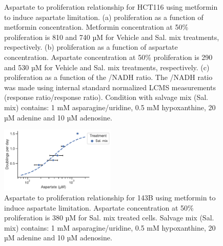 \begin{figure}[ht]
\begin{subfigure}[b]{0.49\textwidth}
         \caption{}
         \label{fig:app_ch2:HCT116_Met_NAD_vs_prlfr}
     \end{subfigure}
        \caption[HCT116 metformin titration aspartate to proliferation.]{
        Aspartate to proliferation relationship for HCT116 using metformin to induce aspartate limitation.
        (a) proliferation as a function of metformin concentration.
        Metformin concentration at 50\% proliferation is 810 and 740 µM for Vehicle and Sal. mix treatments, respectively.
        (b) proliferation as a function of aspartate concentration.
        Aspartate concentration at 50\% proliferation is 290 and 530 µM for Vehicle and Sal. mix treatments, respectively.
        (c) proliferation as a function of the \NAD{}/NADH ratio.
        The \NAD{}/NADH ratio was made using internal standard normalized LCMS measurements (response ratio/response ratio).
        Condition with salvage mix (Sal. mix) contains: 1 mM asparagine/uridine, 0.5 mM hypoxanthine, 20 µM adenine and 10 µM adenosine.
        }
        \label{fig:app_ch2:HCT116_asp_prlfr_met}
\end{figure}

\begin{figure}[ht]
    \centering
    \includegraphics[width=0.49\textwidth]{figures/chap2/app/143B_Met_Asp_vs_prlfr.pdf}
    \caption[143B metformin titration aspartate to proliferation.]{
    Aspartate to proliferation relationship for 143B using metformin to induce aspartate limitation.
    Aspartate concentration at 50\% proliferation is 380 µM for Sal. mix treated cells.
    Salvage mix (Sal. mix) contains: 1 mM asparagine/uridine, 0.5 mM hypoxanthine, 20 µM adenine and 10 µM adenosine.
    }
    \label{fig:app_ch2:143B_Met_Asp_vs_prlfr}
\end{figure}



